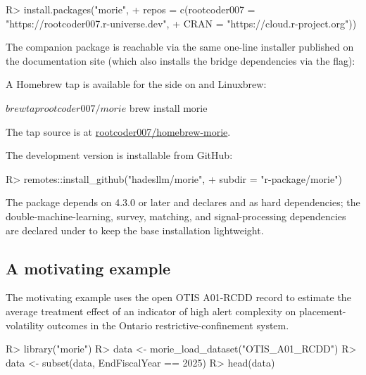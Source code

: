 \documentclass[article,shortnames,nojss]{jss}
\newcommand{\OTIS}{\textsf{OTIS}}
\begin{document}
\begin{Code}
R> install.packages("morie",
+   repos = c(rootcoder007 = "https://rootcoder007.r-universe.dev",
+             CRAN     = "https://cloud.r-project.org"))
\end{Code}

\noindent The companion  package is reachable via
the same one-line installer published on the documentation site
(which also installs the  bridge dependencies via the
 flag):


\noindent A Homebrew tap is available for the
 side on  and Linuxbrew:

\begin{Code}
$ brew tap rootcoder007/morie
$ brew install morie
\end{Code}

\noindent The tap source is at
\href{https://github.com/rootcoder007/homebrew-morie}{rootcoder007/homebrew-morie}.

\noindent The development version is installable from GitHub:

\begin{Code}
R> remotes::install_github("hadesllm/morie",
+   subdir = "r-package/morie")
\end{Code}

\noindent The package depends on  4.3.0 or later and
declares  and  as hard dependencies; the
double-machine-learning, survey, matching, and signal-processing
dependencies are declared under  to keep the base
installation lightweight.

\subsection{A motivating example}

The motivating example uses the open \OTIS{} A01-RCDD record to
estimate the average treatment effect of an indicator of high
alert complexity on placement-volatility outcomes in the Ontario
restrictive-confinement system.

\begin{Code}
R> library("morie")
R> data <- morie_load_dataset("OTIS_A01_RCDD")
R> data <- subset(data, EndFiscalYear == 2025)
R> head(data)
\end{Code}
\end{document}
